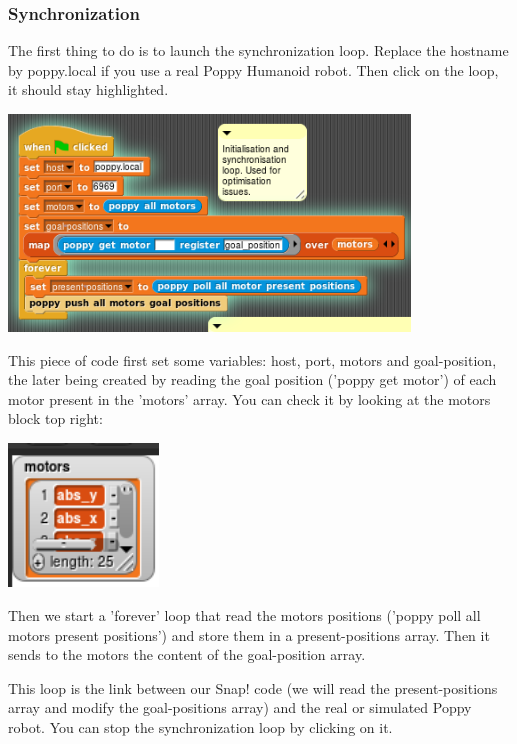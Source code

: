 \documentclass{article}
\begin{document}
\subsubsection{Synchronization}

The first thing to do is to launch the synchronization loop. Replace the hostname by poppy.local if you use a real Poppy Humanoid robot. Then click on the loop, it should stay highlighted.

 \begin{center}
  \includegraphics[width=0.8\textwidth]{img/snap_full_selected}
 \end{center}

This piece of code first set some variables: host, port, motors and goal-position, the later being created by reading the goal position  ('poppy get motor') of each motor present in the 'motors' array. You can check it by looking at the motors block top right:

 \begin{center}
  \includegraphics[width=0.3\textwidth]{img/snap_motors}
 \end{center}


Then we start a 'forever' loop that read the motors positions ('poppy poll all motors present positions') and store them in a present-positions array. Then it sends to the motors the content of the goal-position array.

This loop is the link between our Snap! code (we will read the present-positions array and modify the goal-positions array) and the real or simulated Poppy robot. You can stop the synchronization loop by clicking on it.
\end{document}
